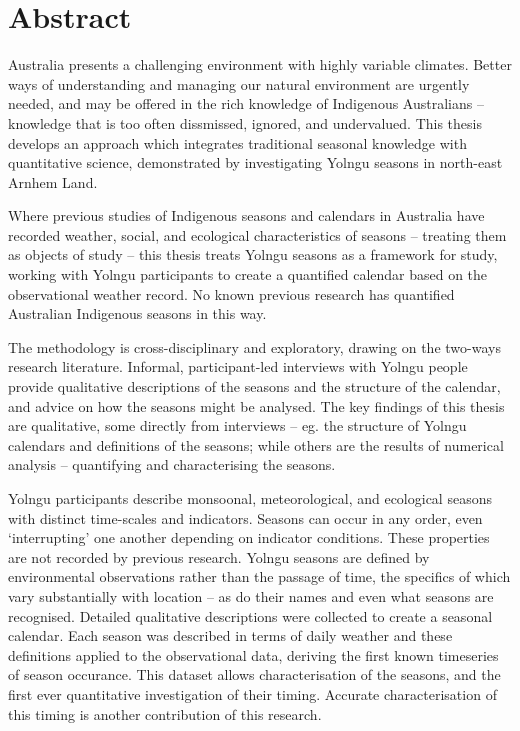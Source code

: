 \chapter{Abstract}

Australia presents a challenging environment with highly variable climates.
Better ways of understanding and managing our natural environment are urgently needed, and
may be offered in the rich knowledge of Indigenous Australians -- knowledge that
is too often dissmissed, ignored, and undervalued.
%
This thesis develops an approach which integrates traditional seasonal knowledge
with quantitative science, demonstrated by investigating Yolngu
seasons in north-east Arnhem Land.

Where previous studies of Indigenous seasons and calendars in Australia have
recorded weather, social, and ecological characteristics of seasons -- treating
them as objects of study -- this thesis treats Yolngu seasons as a framework
for study, working with Yolngu participants to create a quantified calendar
based on the observational weather record.  No known previous research has quantified
Australian Indigenous seasons in this way.


The methodology is cross-disciplinary and exploratory, drawing on the two-ways
research literature.  Informal, participant-led interviews with Yolngu people
provide qualitative descriptions of the seasons and the structure of the
calendar, and advice on how the seasons might be analysed.
%
The key findings of this thesis are qualitative, some directly from interviews
-- eg. the structure of Yolngu calendars and definitions of the seasons; while
others are the results of numerical analysis -- quantifying and characterising the seasons.


Yolngu participants describe monsoonal, meteorological, and ecological
seasons with distinct time-scales and indicators.  Seasons can occur in any
order, even `interrupting' one another depending on indicator conditions.
These properties are not recorded by previous research.
%
Yolngu seasons are defined by environmental observations rather than the
passage of time, the specifics of which vary substantially with location --
as do their names and even what seasons are recognised.  Detailed qualitative
descriptions were collected to create a seasonal calendar.
%
Each season was described in terms of daily weather and these definitions
applied to the observational data, deriving the first known timeseries of
season occurance.  This dataset allows characterisation of the seasons,
and the first ever quantitative investigation of their timing.  Accurate
characterisation of this timing is another contribution of this research.

